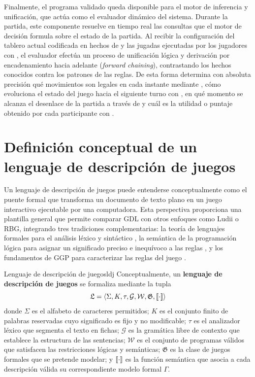 Finalmente, el programa validado queda disponible para el motor de inferencia y unificación, que actúa como el evaluador dinámico del sistema. Durante la partida, este componente resuelve en tiempo real las consultas que el motor de decisión formula sobre el estado de la partida. Al recibir la configuración del tablero actual codificada en hechos de  y las jugadas ejecutadas por los jugadores con , el evaluador efectúa un proceso de unificación lógica y derivación por encadenamiento hacia adelante (\emph{forward chaining}), contrastando los hechos conocidos contra los patrones de las reglas. De esta forma determina con absoluta precisión qué movimientos son legales en cada instante mediante , cómo evoluciona el estado del juego hacia el siguiente turno con , en qué momento se alcanza el desenlace de la partida a través de  y cuál es la utilidad o puntaje obtenido por cada participante con .

\section{Definición conceptual de un lenguaje de descripción de juegos}
\label{sec:an_lenguaje_tupla}

Un lenguaje de descripción de juegos puede entenderse conceptualmente como el puente formal que transforma un documento de texto plano en un juego interactivo ejecutable por una computadora. Esta perspectiva proporciona una plantilla general que permite comparar GDL con otros enfoques como Ludii o RBG, integrando tres tradiciones complementarias: la teoría de lenguajes formales para el análisis léxico y sintáctico \cite{HopcroftMotwaniUllman2006}, la semántica de la programación lógica para asignar un significado preciso e inequívoco a las reglas \cite{Lloyd1987, AptBlairWalker1988}, y los fundamentos de GGP para caracterizar las reglas del juego \cite{Love2008GDL, SchiffelThielscher2010Semantics}.

\begin{definicion}{Lenguaje de descripción de juegos}{ldj}
Conceptualmente, un \textbf{lenguaje de descripción de juegos} se formaliza mediante la tupla
\begin{equation}
    \mathfrak L = \langle \Sigma, K, \tau, \mathcal G, \mathcal W, \mathfrak G, [\![\cdot]\!] \rangle
    \label{eq:an_ldj}
\end{equation}
donde $\Sigma$ es el alfabeto de caracteres permitidos; $K$ es el conjunto finito de palabras reservadas cuyo significado es fijo y no modificable; $\tau$ es el analizador léxico que segmenta el texto en fichas; $\mathcal G$ es la gramática libre de contexto que establece la estructura de las sentencias; $\mathcal W$ es el conjunto de programas válidos que satisfacen las restricciones lógicas y semánticas; $\mathfrak G$ es la clase de juegos formales que se pretende modelar; y $[\![\cdot]\!]$ es la función semántica que asocia a cada descripción válida su correspondiente modelo formal $\Gamma$.
\end{definicion}

